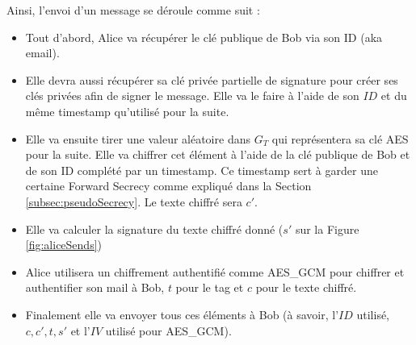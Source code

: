 Ainsi, l'envoi d'un message se déroule comme suit :
\begin{itemize}
	\item Tout d'abord, Alice va récupérer le clé publique de Bob via son ID (aka email).
	\item Elle devra aussi récupérer sa clé privée partielle de signature pour créer ses clés privées afin de signer le message. Elle va le faire à l'aide de son $ID$ et du même timestamp qu'utilisé pour la suite.
	\item Elle va ensuite tirer une valeur aléatoire dans $G_T$ qui représentera sa clé AES pour la suite. Elle va chiffrer cet élément à l'aide de la clé publique de Bob et de son ID complété par un timestamp. Ce timestamp sert à garder une certaine Forward Secrecy comme expliqué dans la Section \ref{subsec:pseudoSecrecy}. Le texte chiffré sera $c'$.
	\item Elle va calculer la signature du texte chiffré donné ($s'$ sur la Figure \ref{fig:aliceSends})
	\item Alice utilisera un chiffrement authentifié comme AES\_GCM pour chiffrer et authentifier son mail à Bob, $t$ pour le tag et $c$ pour le texte chiffré.
	\item Finalement elle va envoyer tous ces éléments à Bob (à savoir, l'$ID$ utilisé, $c, c', t, s'$ et l'$IV$ utilisé pour AES\_GCM).
\end{itemize}

